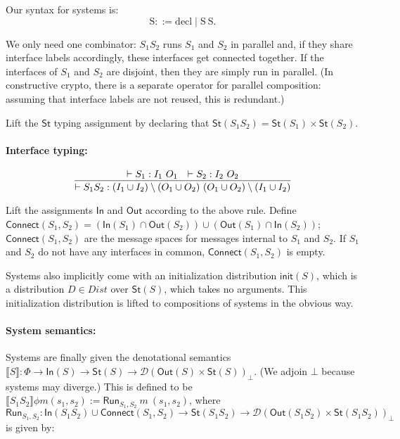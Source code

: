 \documentclass{article}
\begin{document}
Our syntax for systems is:
\[\text{S} ::= \text{decl} \mid \text{S}\  \text{S}. \]


We only need one combinator: $S_1 S_2$ runs $S_1$ and $S_2$ in parallel and, if they share interface labels accordingly, these interfaces get connected together. If the interfaces of $S_1$ and $S_2$ are disjoint, then they are simply run in parallel. (In constructive crypto, there is a separate operator for parallel composition: assuming that interface labels are not reused, this is redundant.)

Lift the $\textsf{St}$ typing assignment by declaring that $\textsf{St}(S_1 S_2) = \textsf{St}(S_1) \times \textsf{St}(S_2)$.
\paragraph{Interface typing:}

\[\infer{\vdash S_1 S_2 : (I_1 \cup I_2) \setminus (O_1 \cup O_2)\ (O_1 \cup O_2) \setminus (I_1 \cup I_2)}{\vdash S_1 : I_1\ O_1 & \vdash S_2 : I_2\ O_2}\]

Lift the assignments $\textsf{In}$ and $\textsf{Out}$ according to the above rule. Define $\textsf{Connect}(S_1, S_2) = (\textsf{In}(S_1) \cap \textsf{Out}(S_2)) \cup (\textsf{Out}(S_1) \cap \textsf{In}(S_2))$; $\textsf{Connect}(S_1, S_2)$ are the message spaces for messages internal to $S_1$ and $S_2$. If $S_1$ and $S_2$ do not have any interfaces in common, $\textsf{Connect}(S_1, S_2)$ is empty. 

Systems also implicitly come with an initialization distribution $\textsf{init}(S)$, which is a distribution $D \in \textit{Dist}$ over $\textsf{St}(S)$, which takes no arguments. This initialization distribution is lifted to compositions of systems in the obvious way.

\paragraph{System semantics:}

Systems are finally given the denotational semantics $\llbracket S \rrbracket : \Phi \to \textsf{In}(S) \to \textsf{St}(S) \to \mathcal{D}(\textsf{Out}(S) \times \textsf{St}(S))_\bot$. (We adjoin $\bot$ because systems may diverge.)
This is defined to be $\llbracket S_1 S_2 \rrbracket \phi m (s_1, s_2) := \textsf{Run}_{S_1, S_2}\ m\ (s_1, s_2)$, where $$\textsf{Run}_{S_1, S_2} : \textsf{In}(S_1 S_2) \cup \textsf{Connect}(S_1, S_2) \to \textsf{St}(S_1 S_2) \to \mathcal{D}(\textsf{Out}(S_1 S_2) \times \textsf{St}(S_1 S_2))_\bot$$ is given by:
\end{document}
